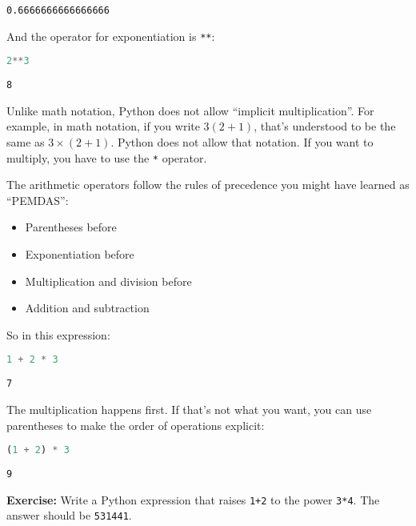 \begin{lstlisting}[style=output]
0.6666666666666666
\end{lstlisting}

And the operator for exponentiation is \passthrough{\lstinline!**!}:

\begin{lstlisting}[language=Python,style=source]
2**3
\end{lstlisting}

\begin{lstlisting}[style=output]
8
\end{lstlisting}

Unlike math notation, Python does not allow ``implicit multiplication''.
For example, in math notation, if you write \(3 (2 + 1)\), that's
understood to be the same as \(3 \times (2+ 1)\). Python does not allow
that notation. If you want to multiply, you have to use the
\passthrough{\lstinline!*!} operator.

The arithmetic operators follow the rules of precedence you might have
learned as ``PEMDAS'':

\begin{itemize}
\tightlist
\item
  Parentheses before
\item
  Exponentiation before
\item
  Multiplication and division before
\item
  Addition and subtraction
\end{itemize}

So in this expression:

\begin{lstlisting}[language=Python,style=source]
1 + 2 * 3
\end{lstlisting}

\begin{lstlisting}[style=output]
7
\end{lstlisting}

The multiplication happens first. If that's not what you want, you can
use parentheses to make the order of operations explicit:

\begin{lstlisting}[language=Python,style=source]
(1 + 2) * 3
\end{lstlisting}

\begin{lstlisting}[style=output]
9
\end{lstlisting}

\textbf{Exercise:} Write a Python expression that raises
\passthrough{\lstinline!1+2!} to the power
\passthrough{\lstinline!3*4!}. The answer should be
\passthrough{\lstinline!531441!}.

